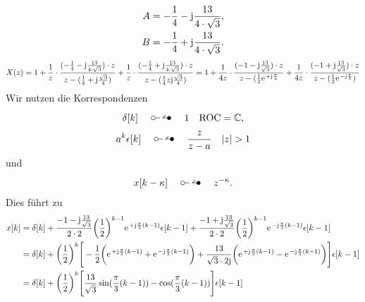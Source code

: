 \begin{align}
	A=-\frac{1}{4}-\im\frac{13}{4\cdot\sqrt{3}}, \nonumber \\
	B=-\frac{1}{4}+\im\frac{13}{4\cdot\sqrt{3}}.
\end{align}
\begin{align}
	X(z)=1+\frac{1}{z}\cdot\frac{(-\frac{1}{4}-\im\frac{13}{4\cdot\sqrt{3}})\cdot z}{z-(\frac{1}{4}+\im\frac{\sqrt{3}}{4})}+\frac{1}{z}\cdot\frac{(-\frac{1}{4}+\im\frac{13}{4\cdot\sqrt{3}})\cdot z}{z-(\frac{1}{4}z\im\frac{\sqrt{3}}{4})}=1+\frac{1}{4z}\cdot\frac{(-1-\im\frac{13}{\sqrt{3}})\cdot z}{z-(\frac{1}{2}\e^{+\im\frac{\pi}{4}}}+\frac{1}{4z}\cdot\frac{(-1+\im\frac{13}{\sqrt{3}})\cdot z}{z-(\frac{1}{2}\e^{-\im\frac{\pi}{3}})}
\end{align}
Wir nutzen die Korrespondenzen
\begin{align}
	\delta[k]\quad\ztransf\quad1\quad\mathrm{ROC}=\mathbb{C},
\end{align}
\begin{align}
	a^k\epsilon[k]\quad\ztransf\quad\frac{z}{z-a}\quad|z|>1
\end{align}
und
\begin{align}
	x[k-\kappa]\quad\ztransf\quad z^{-\kappa}.
\end{align}
Dies führt zu
\begin{align}
	x[k]&=\delta[k]+\frac{-1-\im\frac{13}{\sqrt{3}}}{2\cdot2}\bigg(\frac{1}{2}\bigg)^{k-1}\e^{+\im\frac{\pi}{3}(k-1)}\epsilon[k-1]+\frac{-1+\im\frac{13}{\sqrt{3}}}{2\cdot2}\bigg(\frac{1}{2}\bigg)^{k-1}\e^{-\im\frac{\pi}{3}(k-1)}\epsilon[k-1] \nonumber\\
	&=\delta[k]+\bigg(\frac{1}{2}\bigg)^{k}\Bigg[-\frac{1}{2}\bigg(\e^{+\im\frac{\pi}{3}(k-1)}+\e^{-\im\frac{\pi}{3}(k-1)}\bigg)+\frac{13}{\sqrt{3}\cdot2\im}\bigg(\e^{+\im\frac{\pi}{3}(k-1)}-\e^{-\im\frac{\pi}{3}(k-1)}\bigg)\Bigg ]\epsilon[k-1]\nonumber\\
	&=\delta[k]+\bigg(\frac{1}{2}\bigg)^k\Bigg[\frac{13}{\sqrt{3}}\sin(\frac{\pi}{3}(k-1))-\cos(\frac{\pi}{3}(k-1))\Bigg]\epsilon[k-1]
\end{align}

